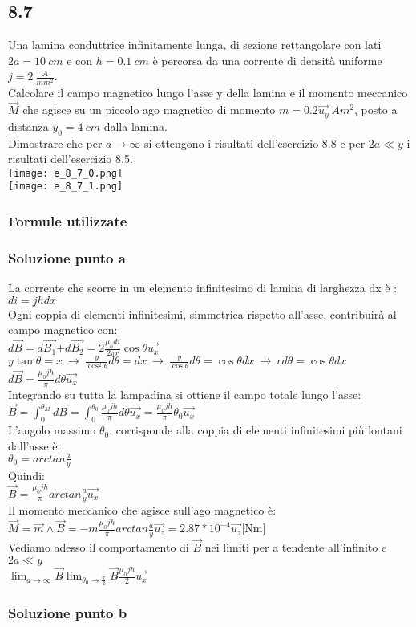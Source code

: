 \documentclass[../../main.tex]{subfiles}
\begin{document}
\subsection*{8.7}
Una lamina conduttrice infinitamente lunga, di sezione rettangolare con lati $2a = 10\ cm$ e con $h=0.1\ cm$ è percorsa da una corrente di densità uniforme $j = 2\ \frac{A}{mm^2}$.
\\Calcolare il campo magnetico lungo l'asse y della lamina e il momento meccanico $\vec{M}$ che agisce su un piccolo ago magnetico di momento $m = 0.2\vec{u_y}\ Am^2$, posto a distanza $y_0 = 4\ cm$ dalla lamina.
\\Dimostrare che per $a \rightarrow \infty$ si ottengono i risultati dell'esercizio 8.8 e per $2a \ll y$ i risultati dell'esercizio 8.5.
\\\texttt{[image: e\_8\_7\_0.png]}
\\\texttt{[image: e\_8\_7\_1.png]}
\subsubsection*{Formule utilizzate}
\subsubsection*{Soluzione punto a}
La corrente che scorre in un elemento infinitesimo di lamina di larghezza dx è :\\
$di = jhdx$\\
Ogni coppia di elementi infinitesimi, simmetrica rispetto all'asse, contribuirà al campo magnetico con:\\
$d\vec{B} = d\vec{B_1}$$+d\vec{B_2} = 2\frac{\mu_0di}{2\pi r}\cos\theta\vec{u_x}$\\
$y\tan\theta = x\ \rightarrow\ \frac{y}{\cos^2\theta}d\theta = dx\ \rightarrow\ \frac{y}{\cos\theta}d\theta = \cos\theta dx\ \rightarrow\ rd\theta = \cos\theta dx$\\
$d\vec{B} = \frac{\mu_0jh}{\pi}d\theta\vec{u_x}$\\
Integrando su tutta la lampadina si ottiene il campo totale lungo l'asse:\\
$\vec{B} = \int_0^{\theta_M}d\vec{B} = \int_0^{\theta_0}\frac{\mu_0jh}{\pi}d\theta\vec{u_x}=\frac{\mu_0jh}{\pi}\theta_0\vec{u_x}$\\
L'angolo massimo $\theta_0$, corrisponde alla coppia di elementi infinitesimi più lontani dall'asse è:\\
$\theta_0 = arctan\frac{a}{y}$\\
Quindi:\\
$\vec{B} = \frac{\mu_0jh}{\pi}arctan\frac{a}{y}\vec{u_x}$\\
Il momento meccanico che agisce sull'ago magnetico è:\\
$\vec{M} = \vec{m}\wedge\vec{B} = -m\frac{\mu_0jh}{\pi}arctan\frac{a}{y}\vec{u_z}=2.87*10^{-4}\vec{u_z}$[Nm]\\
Vediamo adesso il comportamento di $\vec{B}$ nei limiti per a tendente all'infinito e $2a\ll y$\\
$\lim_{a \to \infty} \vec{B} \tilde{} \lim_{\theta_0\to\frac{\pi}{2}}\vec{B} \tilde{} \frac{\mu_0jh}{2}\vec{u_x}$
\subsubsection*{Soluzione punto b}
\newpage
\end{document}
